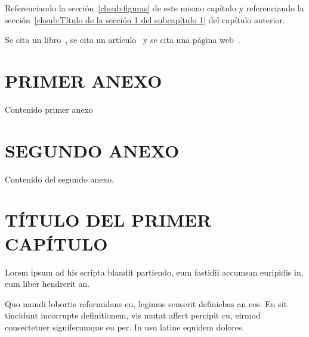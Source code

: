 \documentclass[thesis]{udpbook}
\begin{document}
\parindent=0pt Referenciando la sección~\ref{chsub:figuras} de este mismo capítulo y referenciando la sección~\ref{chsub:Título de la sección 1 del subcapítulo 1} del capítulo anterior.

\vspace{0.5cm}
\parindent=30pt Se cita un libro~\cite{flanagan1998javascript}, se cita un artículo~\cite{stonebraker1991postgres} y se cita una página web~\cite{SCDPreguntas}.


 

\chapter{PRIMER ANEXO}
  \label{ch:capituloAA}

  Contenido primer anexo


  \chapter{SEGUNDO ANEXO}
  \label{ch:capituloAB}


  Contenido del segundo anexo.





\chapter[TÍTULO DEL PRIMER CAPÍTULO]{TÍTULO DEL PRIMER CAPÍTULO}\label{ch:capitulo1}

  \parindent=0pt Lorem ipsum ad his scripta blandit partiendo, eum fastidii accumsan euripidis in, eum liber hendrerit an. 

  \vspace{0.5cm}
  \parindent=30pt Quo mundi lobortis reformidans eu, legimus senserit definiebas an eos. Eu sit tincidunt incorrupte definitionem, vis mutat affert percipit cu, eirmod consectetuer signiferumque eu per. In usu latine equidem dolores.
\end{document}
